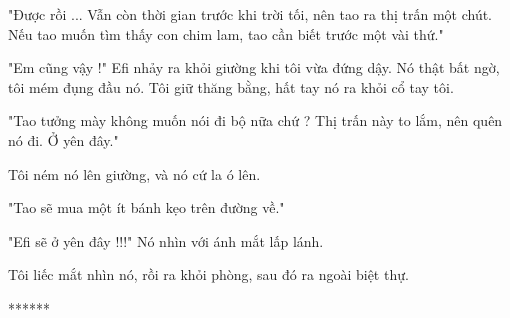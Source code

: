  "Được rồi ... Vẫn còn thời gian trước khi trời tối, nên tao ra thị trấn một chút. Nếu tao muốn tìm thấy con chim lam, tao cần biết trước một vài thứ."
 
 "Em cũng vậy !" Efi nhảy ra khỏi giường khi tôi vừa đứng dậy. Nó thật bất ngờ, tôi mém đụng đầu nó. Tôi giữ thăng bằng, hất tay nó ra khỏi cổ tay tôi.
 
 "Tao tưởng mày không muốn nói đi bộ nữa chứ ? Thị trấn này to lắm, nên quên nó đi. Ở yên đây."
 
 Tôi ném nó lên giường, và nó cứ la ó lên.
 
 "Tao sẽ mua một ít bánh kẹo trên đường về."
 
 "Efi sẽ ở yên đây !!!" Nó nhìn với ánh mắt lấp lánh.
 
 Tôi liếc mắt nhìn nó, rồi ra khỏi phòng, sau đó ra ngoài biệt thự.

 \begin{center}
 	******
 \end{center}
 
  
 
 
 
 













